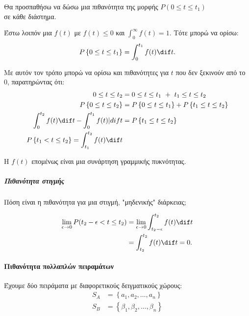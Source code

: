 \documentclass[11pt,a4paper,notitlepage,fleqn,final]{article}
\begin{document}
	Θα προσπαθήσω να δώσω μια πιθανότητα της μορφής 
	\( P(0 \leq t \leq t_1) \)
	\\σε κάθε διάστημα.
	
	Έστω λοιπόν μια \underline{\( f(t) \)} με \( f(t) \leq 0 \) και
	\( \displaystyle \int_0^\infty f(t) = 1 \). Τότε μπορώ να ορίσω:
	\[
	P\left\lbrace 0 \leq t \leq t_1 \right\rbrace =
	\int_0^{t_1} f(t)\dif t.
	\]
	
	Με αυτόν τον τρόπο μπορώ να ορίσω και πιθανότητες για \( t \) που
	δεν ξεκινούν από το 0, παρατηρώντας ότι:
	\begin{align*}
	0 \leq t \leq t_2 &= 0 \leq t \leq t_1 \ + \ t_1\leq t \leq t_2 \\
	P\left\lbrace 0\leq t \leq t_2 \right\rbrace &=
	P\left\lbrace 0 \leq t \leq t_1 \right\rbrace + P\left\lbrace 
	t_1 \leq t \leq t_2 \right\rbrace \\
	\int_0^{t_2} f(t)\dif t - \int_0^{t_1} f(t)|dif t &=
	P\left\lbrace t_1 \leq t \leq t_2 \right\rbrace \\
	P\left\lbrace t_1<t\leq t_2 \right\rbrace =
	\int_{t_1}^{t_2} f(t)\dif t
	\end{align*}


	Η \( f(t) \) επομένως είναι μια συνάρτηση γραμμικής πυκνότητας.
	
	\subparagraph{Πιθανότητα στιγμής}
	Πόση είναι η πιθανότητα για μια στιγμή, "μηδενικής" διάρκειας;
	
	\begin{align*}
		\lim_{\epsilon\to 0} P(t_2-\epsilon < t \leq t_2) &=
		\lim_{\epsilon\to 0} \int_{t_2-\epsilon}^{t_2} f(t)\dif t
		\\ &= \int_{t_2}^{t_2} f(t)\dif t = 0.
	\end{align*}
	
	\paragraph{Πιθανότητα πολλαπλών πειραμάτων}
	Έχουμε δύο πειράματα με διαφορετικούς δειγματικούς χώρους:
	\begin{align*}
		S_A &= \left\lbrace a_1,a_2,\dots,a_n \right\rbrace \\
		S_B &= \left\lbrace \beta_1,\beta_2,\dots,\beta_n \right\rbrace
	\end{align*}
	
\end{document}
